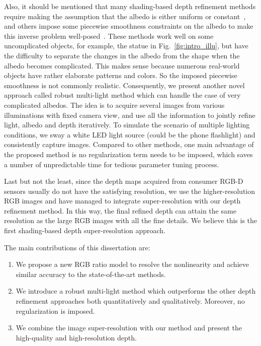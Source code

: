 Also, it should be mentioned that many shading-based depth refinement methods require making the assumption that the albedo is either uniform or constant~\cite{wu2011shading, han2013high, park2013multiview, haque2014high, queau2017dense}, and others impose some piecewise smoothness constraints on the albedo to make this inverse problem well-posed~\cite{or2015rgbd, or2016real, kim2015joint, wu2014real}.
These methods work well on some uncomplicated objects, for example, the statue in Fig.~\ref{fig:intro_illu}, but have the difficulty to separate the changes in the albedo from the shape when the albedo becomes complicated. This makes sense because numerous real-world objects have rather elaborate patterns and colors.
So the imposed piecewise smoothness is not commonly realistic.
Consequently, we present another novel approach called robust multi-light method which can handle the case of very complicated albedos.
The idea is to acquire several images from various illuminations with fixed camera view, and use all the information to jointly refine light, albedo and depth iteratively.
To simulate the scenario of multiple lighting conditions, we sway a white LED light source (could be the phone flashlight) and consistently capture images. 
Compared to other methods, one main advantage of the proposed method is no regularization term needs to be imposed, which saves a number of unpredictable time for tedious parameter tuning process.

Last but not the least, since the depth maps acquired from consumer RGB-D sensors usually do not have the satisfying resolution, we use the higher-resolution RGB images and have managed to integrate super-resolution with our depth refinement method.
In this way, the final refined depth can attain the same resolution as the large RGB images with all the fine details.
We believe this is the first shading-based depth super-resolution approach.

The main contributions of this dissertation are:
\begin{enumerate}
    \item We propose a new RGB ratio model to resolve the nonlinearity and achieve similar accuracy to the state-of-the-art methods.
    \item We introduce a robust multi-light method which outperforms the other depth refinement approaches both quantitatively and qualitatively. Moreover, no regularization is imposed.
    \item We combine the image super-resolution with our method and present the high-quality and high-resolution depth.
\end{enumerate}


